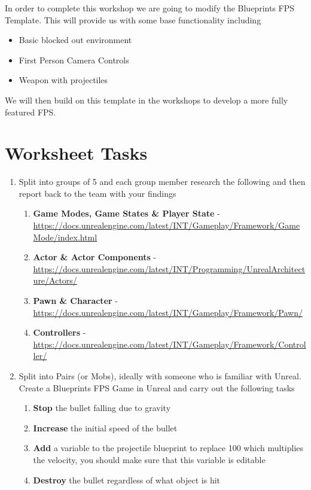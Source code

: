 \documentclass{../../fal_assignment}
\begin{document}
In order to complete this workshop we are going to modify the Blueprints FPS Template. This will provide us with some base functionality including 

\begin{itemize}
	\item Basic blocked out environment
	\item First Person Camera Controls
	\item Weapon with projectiles
\end{itemize}

We will then build on this template in the workshops to develop a more fully featured FPS.

\section*{Worksheet Tasks}

\begin{enumerate}
	\item Split into groups of 5 and each group member research the following and then report back to  the team with your findings
	\begin{enumerate}[label=(\Alph*)]
		\item \textbf{Game Modes, Game States \& Player State} - \url{https://docs.unrealengine.com/latest/INT/Gameplay/Framework/GameMode/index.html}
		\item \textbf{Actor \& Actor Components} - \url{https://docs.unrealengine.com/latest/INT/Programming/UnrealArchitecture/Actors/}
		\item \textbf{Pawn \& Character} - \url{https://docs.unrealengine.com/latest/INT/Gameplay/Framework/Pawn/}
		\item \textbf{Controllers} - \url{https://docs.unrealengine.com/latest/INT/Gameplay/Framework/Controller/} 
	\end{enumerate}
	\item Split into Pairs (or Mobs), ideally with someone who is familiar with Unreal. Create a Blueprints FPS Game in Unreal and carry out the following tasks
		\begin{enumerate}[label=(\Alph*)]
		\item \textbf{Stop} the bullet falling due to gravity
		\item \textbf{Increase} the initial speed of the bullet
		\item \textbf{Add} a variable to the projectile blueprint to replace 100 which multiplies the velocity, you should make sure that this variable is editable
		\item \textbf{Destroy} the bullet regardless of what object is hit
		\end{enumerate}
\end{enumerate}
\end{document}
